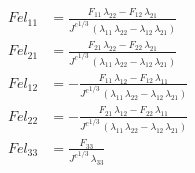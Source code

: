 \begin{align}
Fel_{11} &= \frac{F_{11}\,\lambda _{22}-F_{12}\,\lambda _{21}}{{J^{c}}^{1/3}\,\left(\lambda _{11}\,\lambda _{22}-\lambda _{12}\,\lambda _{21}\right)} \\ 
Fel_{21} &= \frac{F_{21}\,\lambda _{22}-F_{22}\,\lambda _{21}}{{J^{c}}^{1/3}\,\left(\lambda _{11}\,\lambda _{22}-\lambda _{12}\,\lambda _{21}\right)} \\ 
Fel_{12} &= -\frac{F_{11}\,\lambda _{12}-F_{12}\,\lambda _{11}}{{J^{c}}^{1/3}\,\left(\lambda _{11}\,\lambda _{22}-\lambda _{12}\,\lambda _{21}\right)} \\ 
Fel_{22} &= -\frac{F_{21}\,\lambda _{12}-F_{22}\,\lambda _{11}}{{J^{c}}^{1/3}\,\left(\lambda _{11}\,\lambda _{22}-\lambda _{12}\,\lambda _{21}\right)} \\ 
Fel_{33} &= \frac{F_{33}}{{J^{c}}^{1/3}\,\lambda _{33}} 
\end{align}
